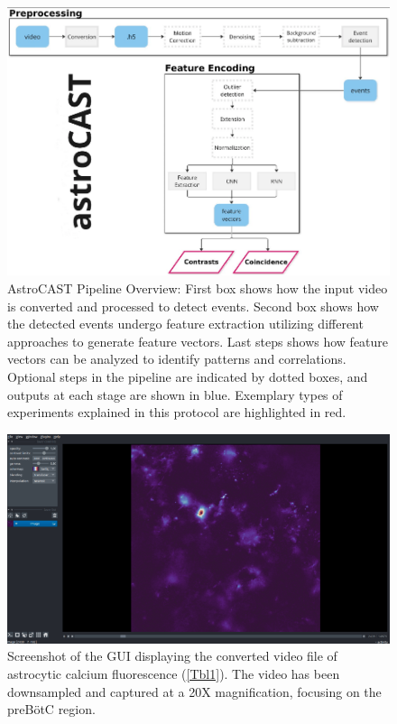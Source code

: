 \begin{figure}[!htb]
\begin{center}
\includegraphics[width=\linewidth]{figures/1.png}
\end{center}
\caption{AstroCAST Pipeline Overview: First box shows how the input video is converted and processed to detect events. Second box shows how the detected events undergo feature extraction utilizing different approaches to generate feature vectors. Last steps shows how feature vectors can be analyzed to identify patterns and correlations. Optional steps in the pipeline are indicated by dotted boxes, and outputs at each stage are shown in blue. Exemplary types of experiments explained in this protocol are highlighted in red.}\label{fig:1}
\end{figure}

\begin{figure}[!htb]
\begin{center}
\includegraphics[width=\linewidth]{figures/2.png}
\end{center}
\caption{Screenshot of the \ac{GUI} displaying the converted video file of astrocytic calcium fluorescence (\ref{Tbl1}). The video has been downsampled and captured at a 20X magnification, focusing on the \ac{preBötC} region.}\label{fig:2}
\end{figure}

